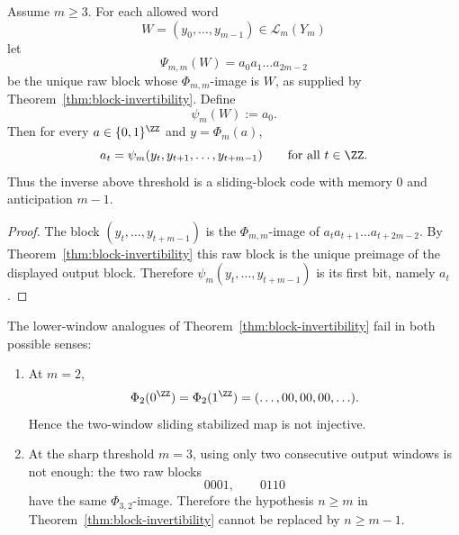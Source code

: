 \begin{corollary}\label{cor:explicit-decoder}
Assume $m\ge3$.  For each allowed word
\[
W=(y_0,\ldots,y_{m-1})\in\mathcal L_m(Y_m)
\]
let
\[
\Psi_{m,m}(W)=a_0a_1\ldots a_{2m-2}
\]
be the unique raw block whose $\Phi_{m,m}$-image is $W$, as supplied by
Theorem~\ref{thm:block-invertibility}.  Define
\[
\psi_m(W):=a_0.
\]
Then for every $a\in\{0,1\}^{\ZZ}$ and $y=\Phi_m(a)$,
\[
a_t=\psi_m(y_t,y_{t+1},\ldots,y_{t+m-1})
\qquad\text{for all }t\in\ZZ.
\]
Thus the inverse above threshold is a sliding-block code with memory $0$ and
anticipation $m-1$.
\end{corollary}

\begin{proof}
The block $(y_t,\ldots,y_{t+m-1})$ is the $\Phi_{m,m}$-image of
$a_ta_{t+1}\ldots a_{t+2m-2}$.  By Theorem~\ref{thm:block-invertibility} this
raw block is the unique preimage of the displayed output block.  Therefore
$\psi_m(y_t,\ldots,y_{t+m-1})$ is its first bit, namely $a_t$.
\end{proof}

\begin{proposition}\label{prop:low-window-counterexamples}
The lower-window analogues of Theorem~\ref{thm:block-invertibility} fail in
both possible senses:
\begin{enumerate}[label=(\roman*),leftmargin=*,itemsep=2pt]
  \item At $m=2$,
  \[
  \Phi_2(0^{\ZZ})=\Phi_2(1^{\ZZ})=(\ldots,00,00,00,\ldots).
  \]
  Hence the two-window sliding stabilized map is not injective.
  \item At the sharp threshold $m=3$, using only two consecutive output
  windows is not enough: the two raw blocks
  \[
  0001,\qquad 0110
  \]
  have the same $\Phi_{3,2}$-image.  Therefore the hypothesis
  $n\ge m$ in Theorem~\ref{thm:block-invertibility} cannot be replaced by
  $n\ge m-1$.
\end{enumerate}
\end{proposition}

